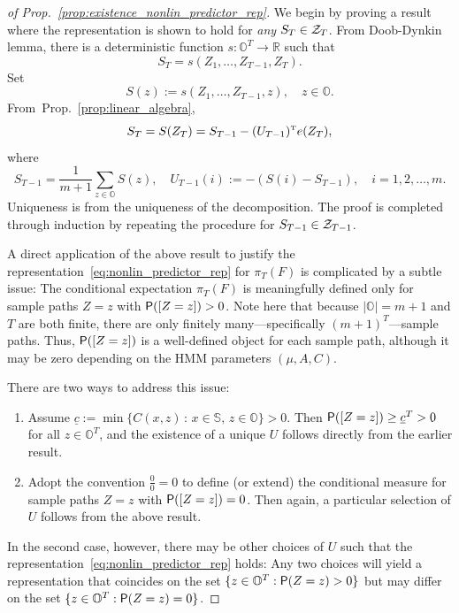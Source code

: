 \documentclass[twoside,11pt]{article}
\def\Re{\mathbb{R}}
\newcommand{\field}[1]{\mathbb{#1}}
\def\Re{\field{R}}
\def\clZ{{\cal Z}}
\def\clZ{{\cal Z}}
\def\bS{\begin{slide}}
\def\Re{\mathbb{R}}
\def\Prop#1{Prop.~\ref{#1}}
\def\clZ{{\cal Z}}
\renewcommand{\Re}{\mathbb{R}}
\def\clZ{{\cal Z}}
\def\bS{\mathbb{S}}
\def\bO{\mathbb{O}}
\def\sP{{\sf P}}
\def\tp{{\hbox{\rm\tiny T}}}
\begin{document}
\begin{proof}[of \Prop{prop:existence_nonlin_predictor_rep}]
We begin by proving a result where the representation is shown to hold
for {\em any} $S_T \in \clZ_T$.  From Doob-Dynkin lemma, there is a
deterministic function $s:\bO^T \to \Re$ such that
\begin{equation*}
S_T = s(Z_1,\hdots,Z_{T-1},Z_T).
\end{equation*}
Set
\begin{equation*}
S(z) := s(Z_1,\hdots,Z_{T-1},z),\quad z\in\bO.
\end{equation*}
From~\Prop{prop:linear_algebra},
\begin{equation*}
S_T = S(Z_T) = S_{T-1} - (U_{T-1})^\tp e(Z_T),
\end{equation*}
where
\begin{equation*}
  S_{T-1} = \frac{1}{m+1} \sum_{z\in \bO} S(z),\quad 
 U_{T-1}(i):= - (S(i) - S_{T-1}),\quad
i=1,2,\hdots,m.
\end{equation*}
Uniqueness is from the uniqueness of the decomposition. The proof is completed through induction by
repeating the procedure for $S_{T-1}\in\clZ_{T-1}$.

A direct application of the above result to justify the
representation~\eqref{eq:nonlin_predictor_rep} for $\pi_T(F)$ is
complicated by a subtle issue: The conditional expectation $\pi_T(F)$
is meaningfully defined only for sample paths $Z=z$ with 
$\sP([Z=z])>0$.  Note here that because $|\bO|=m+1$ and $T$ are
both finite, there are only finitely many---specifically $(m+1)^T$---sample paths.
Thus, $\sP([Z=z])$ is a well-defined object for each sample path, 
although it may be zero depending on the HMM parameters $(\mu,A,C)$.

There are two ways to address this issue: 
\begin{enumerate}
\item Assume $\underline{c}:=\min\{C(x,z)
  \,:\,x\in\bS,\,z\in\bO\} >0$.  Then
  $\sP([Z=z])\geq\underline{c}^T > 0$ for all $z\in\bO^T$,
and the existence of a unique $U$ follows directly from the earlier result.
\item Adopt the convention $\frac{0}{0}=0$ to define (or extend) the conditional measure for sample
paths $Z=z$ with $\sP([Z=z])=0$. Then again, a particular
selection of $U$ follows from the above result.
\end{enumerate}
In the second case, however, there
may be other choices of $U$ such that the
representation~\eqref{eq:nonlin_predictor_rep} holds: Any two choices
will yield a representation that coincides on the set $\{z\in \bO^{T}:
\sP(Z=z)>0\}$ but may differ on the set $\{z\in \bO^{T}:
\sP(Z=z)=0\}$.
\end{proof}
\end{document}

